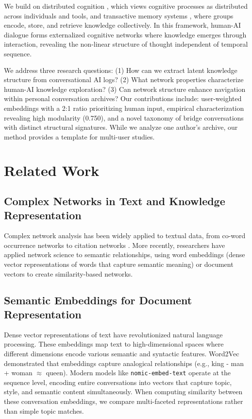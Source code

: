 \documentclass{svproc}
\begin{document}
We build on distributed cognition \cite{hutchins1995}, which views cognitive processes as distributed across individuals and tools, and transactive memory systems \cite{wegner1987}, where groups encode, store, and retrieve knowledge collectively. In this framework, human-AI dialogue forms externalized cognitive networks where knowledge emerges through interaction, revealing the non-linear structure of thought independent of temporal sequence.

We address three research questions: (1) How can we extract latent knowledge structure from conversational AI logs? (2) What network properties characterize human-AI knowledge exploration? (3) Can network structure enhance navigation within personal conversation archives? Our contributions include: user-weighted embeddings with a 2:1 ratio prioritizing human input, empirical characterization revealing high modularity (0.750), and a novel taxonomy of bridge conversations with distinct structural signatures. While we analyze one author's archive, our method provides a template for multi-user studies.

\section{Related Work}

\subsection{Complex Networks in Text and Knowledge Representation}

Complex network analysis has been widely applied to textual data, from co-word occurrence networks \cite{callon1983} to citation networks \cite{price1965}. More recently, researchers have applied network science to semantic relationships, using word embeddings (dense vector representations of words that capture semantic meaning) \cite{levy2014} or document vectors \cite{mikolov2013} to create similarity-based networks.

\subsection{Semantic Embeddings for Document Representation}

Dense vector representations of text have revolutionized natural language processing. These embeddings map text to high-dimensional spaces where different dimensions encode various semantic and syntactic features. Word2Vec \cite{mikolov2013} demonstrated that embeddings capture analogical relationships (e.g., king - man + woman $\approx$ queen). Modern models like \texttt{nomic-embed-text} operate at the sequence level, encoding entire conversations into vectors that capture topic, style, and semantic content simultaneously. When computing similarity between these conversation embeddings, we compare multi-faceted representations rather than simple topic matches.
\end{document}
